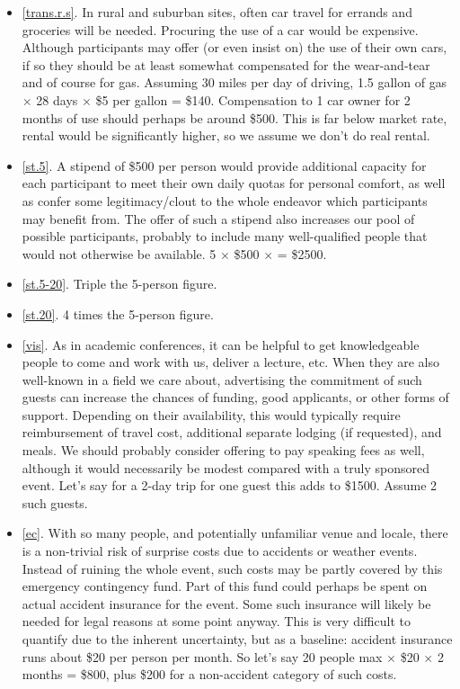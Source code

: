 \documentclass[10pt]{article}
\begin{document}
\begin{itemize}[leftmargin=*]
  \item[]{\ref{trans.r.s}. In rural and suburban sites, often car travel for errands and groceries will be needed. Procuring the use of a car would be expensive. Although participants may offer (or even insist on) the use of their own cars, if so they should be at least somewhat compensated for the wear-and-tear and of course for gas. Assuming 30 miles per day of driving, 1.5 gallon of gas $\times$ 28 days $\times$ \$5 per gallon = \$140. Compensation to 1 car owner for 2 months of use should perhaps be around \$500. This is far below market rate, rental would be significantly higher, so we assume we don't do real rental.}
  \item[]{\ref{st.5}. A stipend of \$500 per person would provide additional capacity for each participant to meet their own daily quotas for personal comfort, as well as confer some legitimacy/clout to the whole endeavor which participants may benefit from. The offer of such a stipend also increases our pool of possible participants, probably to include many well-qualified people that would not otherwise be available. 5 $\times$ \$500 $\times$ = \$2500.}
  \item[]{\ref{st.5-20}. Triple the 5-person figure.}
  \item[]{\ref{st.20}. 4 times the 5-person figure.}
  \item[]{\ref{vis}. As in academic conferences, it can be helpful to get knowledgeable people to come and work with us, deliver a lecture, etc. When they are also well-known in a field we care about, advertising the commitment of such guests can increase the chances of funding, good applicants, or other forms of support. Depending on their availability, this would typically require reimbursement of travel cost, additional separate lodging (if requested), and meals. We should probably consider offering to pay speaking fees as well, although it would necessarily be modest compared with a truly sponsored event. Let's say for a 2-day trip for one guest this adds to \$1500. Assume 2 such guests.}
  \item[]{\ref{ec}. With so many people, and potentially unfamiliar venue and locale, there is a non-trivial risk of surprise costs due to accidents or weather events. Instead of ruining the whole event, such costs may be partly covered by this emergency contingency fund. Part of this fund could perhaps be spent on actual accident insurance for the event. Some such insurance will likely be needed for legal reasons at some point anyway. This is very difficult to quantify due to the inherent uncertainty, but as a baseline: accident insurance runs about \$20 per person per month. So let's say 20 people max $\times$ \$20 $\times$ 2 months = \$800, plus \$200 for a non-accident category of such costs.}

\end{itemize}
\end{document}
